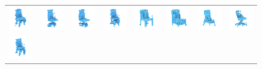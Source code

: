 \begin{figure}[t]
\setlength{\tabcolsep}{0pt}
\centering
\begin{tabular}{cccc|cccc}
\includegraphics[width=.12\linewidth]{fig/comparison/3dgan8.png} &
\includegraphics[width=.12\linewidth]{fig/comparison/3dgan9.png} &
\includegraphics[width=.12\linewidth]{fig/comparison/3dgan10.png} &
\includegraphics[width=.12\linewidth]{fig/comparison/3dgan11.png} &
\includegraphics[width=.12\linewidth]{fig/comparison/prgan0.png} &
\includegraphics[width=.12\linewidth]{fig/comparison/prgan1.png} &
\includegraphics[width=.12\linewidth]{fig/comparison/prgan2.png} &
\includegraphics[width=.12\linewidth]{fig/comparison/prgan3.png} \\
\includegraphics[width=.12\linewidth]{fig/comparison/3dgan12.png} &

\end{tabular}
\end{figure}
